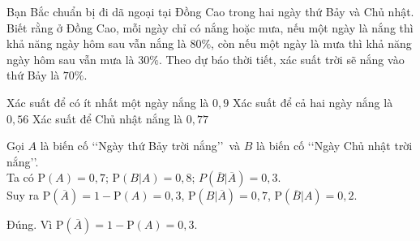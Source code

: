 \begin{ex}%
	Bạn Bắc chuẩn bị đi dã ngoại tại Đồng Cao trong hai ngày thứ Bảy và Chủ nhật. Biết rằng ở Đồng Cao, mỗi ngày chỉ có nắng hoặc mưa, nếu một ngày là nắng thì khả năng ngày hôm sau vẫn nắng là $80\%$, còn nếu một ngày là mưa thì khả năng ngày hôm sau vẫn mưa là $30\%$. Theo dự báo thời tiết, xác suất trời sẽ nắng vào thứ Bảy là $70\%$. 
	\begin{center}
	\end{center}
	{Xác suất để có ít nhất một ngày nắng là $0{,}9$}
	{\True Xác suất để cả hai ngày nắng là $0{,}56$}
	{\True Xác suất để Chủ nhật nắng là $0{,}77$}
	\loigiai
	{
		Gọi $A$ là biến cố \lq\lq Ngày thứ Bảy trời nắng\rq\rq\ và $B$ là biến cố \lq\lq Ngày Chủ nhật trời nắng\rq\rq.\\
		Ta có $\mathrm{P}(A)=0{,}7$; $\mathrm{P}(B|A)= 0{,}8$; $P\left(\overline{B}\big|\overline{A}\right)= 0{,}3$.\\
		Suy ra $\mathrm{P}\left(\overline{A}\right)= 1-\mathrm{P}(A)= 0{,}3$, $\mathrm{P}\left(B|\overline{A}\right)= 0{,}7$, $\mathrm{P}\left(\overline{B}|A\right)= 0{,}2$.
		\begin{itemchoice}
			\itemch Đúng. Vì $\mathrm{P}\left(\overline{A}\right)= 1-\mathrm{P}(A)= 0{,}3$.

\end{itemchoice}}
\end{ex}
